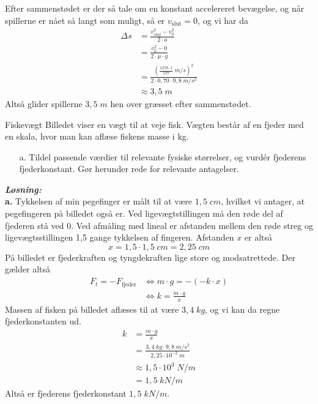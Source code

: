 \documentclass{report}
\newcommand{\sol}{\setlength{\parindent}{0cm}\textbf{\textit{Løsning:}}\setlength{\parindent}{1cm}}
\begin{document}
Efter sammenstødet er der så tale om en konstant accelereret bevægelse, og når spillerne er nået så langt som muligt, så er $v_{\text{slut} }=0$, og vi har da 
\begin{equation*}
\begin{split}
  \Delta s&=\frac{v _{slut}^2-v_0^2}{2 \cdot a}\\
  &=\frac{v_0^2-0}{2 \cdot \mu \cdot g}\\
  &=\frac{\left(\frac{1218,1}{177} \;\unit{m/s} \right)^2}{2 \cdot 0,70 \cdot 9,8 \;\unit{m/s^2} }\\
  &\approx 3,5 \;\unit{m} 
\end{split}
\end{equation*}
Altså glider spillerne $3,5 \;\unit{m} $ hen over græsset efter sammenstødet. 

\begin{question}{Fiskevægt}{}
Billedet viser en vægt til at veje fisk. Vægten består af en fjeder med en skala, hvor man kan aflæse fiskens masse i kg.
\begin{itemize}
  \item[a.] Tildel passende værdier til relevante fysiske størrelser, og vurdér fjederens fjederkonstant. 
  Gør herunder rede for relevante antagelser.
\end{itemize}
\end{question}
\sol \\
\textbf{a.}
Tykkelsen af min pegefinger er målt til at være $1,5 \;\unit{cm} $, hvilket vi antager, at pegefingeren på billedet også er.
Ved ligevægtstillingen må den røde del af fjederen stå ved 0.
Ved afmåling med lineal er afstanden mellem den røde streg og ligevægtsstillingen 1,5 gange tykkelsen af fingeren.
Afstanden $x$ er altså 
\[
x=1,5 \cdot 1,5 \;\unit{cm} =2,25 \;\unit{cm} 
\] 
På billedet er fjederkraften og tyngdekraften lige store og modsatrettede.
Der gælder altså
\begin{equation*}
\begin{split}
  F_t=-F_{\text{fjeder} } &\iff m \cdot g = -(-k \cdot x) \\
  &\iff k=\frac{m \cdot g}{x}
\end{split}
\end{equation*}
Massen af fisken på billedet aflæses til at være $3,4 \;\unit{kg} $, og vi kan da regne fjederkonstanten ud.
\begin{equation*}
\begin{split}
  k&=\frac{m \cdot g}{x}\\
  &=\frac{3,4 \;\unit{kg} \cdot 9,8 \;\unit{m/s^2}}{2,25 \cdot 10^{-2}\;\unit{m} }\\
  &\approx 1,5 \cdot 10^3 \;\unit{N/m} \\
  &=1,5 \;\unit{kN/m} 
\end{split}
\end{equation*}
Altså er fjederens fjederkonstant $1,5 \;\unit{kN/m} $.
\end{document}
